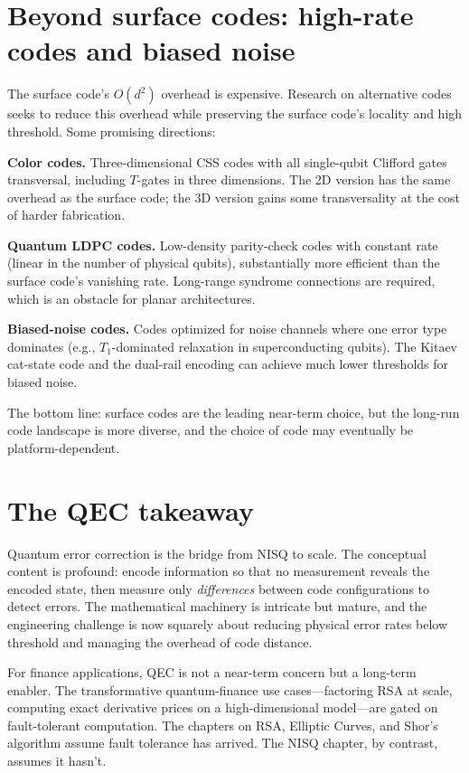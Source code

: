 \section{Beyond surface codes: high-rate codes and biased noise}

The surface code's $O(d^2)$ overhead is expensive. Research on alternative codes seeks to reduce this overhead while preserving the surface code's locality and high threshold. Some promising directions:

\textbf{Color codes.} Three-dimensional CSS codes with all single-qubit Clifford gates transversal, including $T$-gates in three dimensions. The 2D version has the same overhead as the surface code; the 3D version gains some transversality at the cost of harder fabrication.

\textbf{Quantum LDPC codes.} Low-density parity-check codes with constant rate (linear in the number of physical qubits), substantially more efficient than the surface code's vanishing rate. Long-range syndrome connections are required, which is an obstacle for planar architectures.

\textbf{Biased-noise codes.} Codes optimized for noise channels where one error type dominates (e.g., $T_1$-dominated relaxation in superconducting qubits). The Kitaev cat-state code and the dual-rail encoding can achieve much lower thresholds for biased noise.

The bottom line: surface codes are the leading near-term choice, but the long-run code landscape is more diverse, and the choice of code may eventually be platform-dependent.

\section{The QEC takeaway}

Quantum error correction is the bridge from NISQ to scale. The conceptual content is profound: encode information so that no measurement reveals the encoded state, then measure only \emph{differences} between code configurations to detect errors. The mathematical machinery is intricate but mature, and the engineering challenge is now squarely about reducing physical error rates below threshold and managing the overhead of code distance.

For finance applications, QEC is not a near-term concern but a long-term enabler. The transformative quantum-finance use cases---factoring RSA at scale, computing exact derivative prices on a high-dimensional model---are gated on fault-tolerant computation. The chapters on RSA, Elliptic Curves, and Shor's algorithm assume fault tolerance has arrived. The NISQ chapter, by contrast, assumes it hasn't.

\textsep
